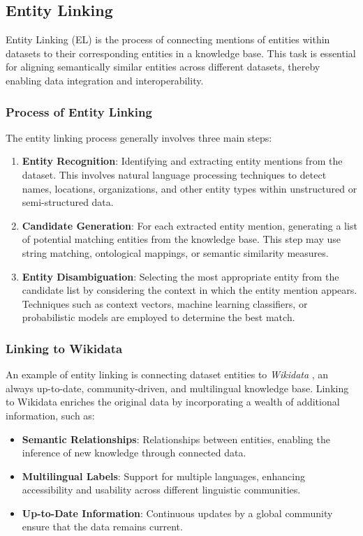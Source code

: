 \subsection{Entity Linking}\label{VI-subsec:entitylinking}

Entity Linking (EL) is the process of connecting mentions of entities within datasets to their corresponding entities in a knowledge base. This task is essential for aligning semantically similar entities across different datasets, thereby enabling data integration and interoperability.

\subsubsection{Process of Entity Linking}

The entity linking process generally involves three main steps:

\begin{enumerate}
    \item \textbf{Entity Recognition}: Identifying and extracting entity mentions from the dataset. This involves natural language processing techniques to detect names, locations, organizations, and other entity types within unstructured or semi-structured data.
    \item \textbf{Candidate Generation}: For each extracted entity mention, generating a list of potential matching entities from the knowledge base. This step may use string matching, ontological mappings, or semantic similarity measures.
    \item \textbf{Entity Disambiguation}: Selecting the most appropriate entity from the candidate list by considering the context in which the entity mention appears. Techniques such as context vectors, machine learning classifiers, or probabilistic models are employed to determine the best match.
\end{enumerate}

\subsubsection{Linking to Wikidata}

An example of entity linking is connecting dataset entities to \textit{Wikidata} \cite{Wikidata}, an always up-to-date, community-driven, and multilingual knowledge base. Linking to Wikidata enriches the original data by incorporating a wealth of additional information, such as:

\begin{itemize}
    \item \textbf{Semantic Relationships}: Relationships between entities, enabling the inference of new knowledge through connected data.
    \item \textbf{Multilingual Labels}: Support for multiple languages, enhancing accessibility and usability across different linguistic communities.
    \item \textbf{Up-to-Date Information}: Continuous updates by a global community ensure that the data remains current.
\end{itemize}


